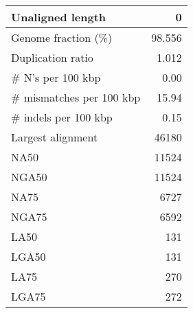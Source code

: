 \documentclass[12pt,a4paper]{article}
\begin{document}
\begin{table}[ht]
\begin{center}
\begin{tabular}{|l*{1}{|r}|}
Unaligned length & 0 \\ \hline
Genome fraction (\%) & 98.556 \\ \hline
Duplication ratio & 1.012 \\ \hline
\# N's per 100 kbp & 0.00 \\ \hline
\# mismatches per 100 kbp & 15.94 \\ \hline
\# indels per 100 kbp & 0.15 \\ \hline
Largest alignment & 46180 \\ \hline
NA50 & 11524 \\ \hline
NGA50 & 11524 \\ \hline
NA75 & 6727 \\ \hline
NGA75 & 6592 \\ \hline
LA50 & 131 \\ \hline
LGA50 & 131 \\ \hline
LA75 & 270 \\ \hline
LGA75 & 272 \\ \hline
\end{tabular}
\end{center}
\end{table}
\end{document}
